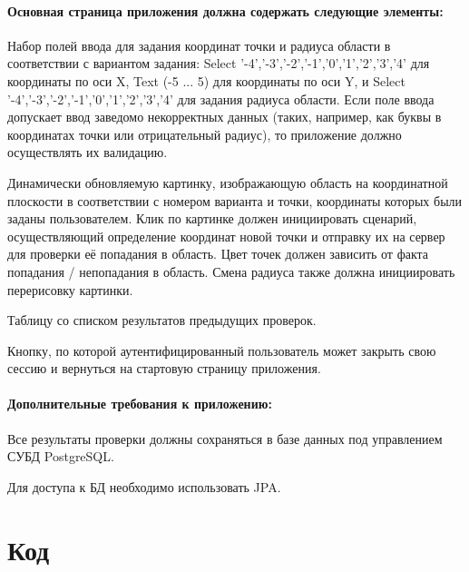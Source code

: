 \documentclass[a4paper, 12pt]{article}
\newenvironment{itemize*}%
  {\begin{itemize}%
    \setlength{\itemsep}{1pt}%
    \setlength{\parskip}{1pt}}%
  {\end{itemize}}
\begin{document}
\paragraph{Основная страница приложения должна содержать следующие элементы:}
\begin{itemize*}
\item Набор полей ввода для задания координат точки и радиуса области в соответствии с вариантом задания: Select {'-4','-3','-2','-1','0','1','2','3','4'} для координаты по оси X, Text (-5 ... 5) для координаты по оси Y, и Select {'-4','-3','-2','-1','0','1','2','3','4'} для задания радиуса области. Если поле ввода допускает ввод заведомо некорректных данных (таких, например, как буквы в координатах точки или отрицательный радиус), то приложение должно осуществлять их валидацию.
\item Динамически обновляемую картинку, изображающую область на координатной плоскости в соответствии с номером варианта и точки, координаты которых были заданы пользователем. Клик по картинке должен инициировать сценарий, осуществляющий определение координат новой точки и отправку их на сервер для проверки её попадания в область. Цвет точек должен зависить от факта попадания / непопадания в область. Смена радиуса также должна инициировать перерисовку картинки.
\item Таблицу со списком результатов предыдущих проверок.
\item Кнопку, по которой аутентифицированный пользователь может закрыть свою сессию и вернуться на стартовую страницу приложения.
\end{itemize*}




\paragraph{Дополнительные требования к приложению:}
\begin{itemize*}
\item Все результаты проверки должны сохраняться в базе данных под управлением СУБД PostgreSQL.
\item Для доступа к БД необходимо использовать JPA.
\end{itemize*}

\newpage

\section{Код}



\end{document}
